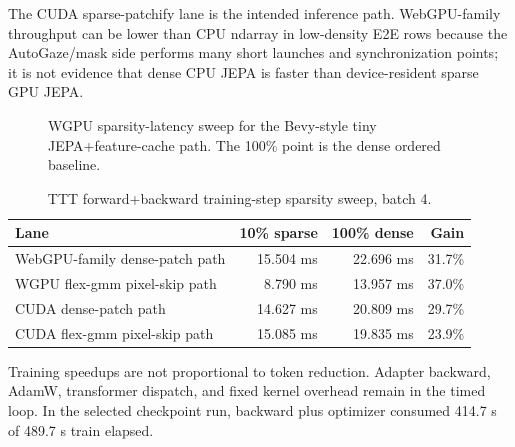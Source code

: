 \documentclass[10pt]{article}
\begin{document}
The CUDA sparse-patchify lane is the intended inference path.  WebGPU-family
throughput can be lower than CPU ndarray in low-density E2E rows because the
AutoGaze/mask side performs many short launches and synchronization points; it
is not evidence that dense CPU JEPA is faster than device-resident sparse GPU
JEPA.

\begin{figure}[t]
\centering
{}
\caption{WGPU sparsity-latency sweep for the Bevy-style tiny JEPA+feature-cache
path.  The 100\% point is the dense ordered baseline.}
\label{fig:sparsity-latency}
\end{figure}

\begin{table}[t]
\centering
\caption{TTT forward+backward training-step sparsity sweep, batch 4.}
\label{tab:train}
\begin{tabular}{lrrr}
\toprule
Lane & 10\% sparse & 100\% dense & Gain \\
\midrule
WebGPU-family dense-patch path & 15.504 ms & 22.696 ms & 31.7\% \\
WGPU flex-gmm pixel-skip path & 8.790 ms & 13.957 ms & 37.0\% \\
CUDA dense-patch path & 14.627 ms & 20.809 ms & 29.7\% \\
CUDA flex-gmm pixel-skip path & 15.085 ms & 19.835 ms & 23.9\% \\
\bottomrule
\end{tabular}
\end{table}

Training speedups are not proportional to token reduction.  Adapter backward,
AdamW, transformer dispatch, and fixed kernel overhead remain in the timed
loop.  In the selected checkpoint run, backward plus optimizer consumed
414.7 s of 489.7 s train elapsed.
\end{document}
